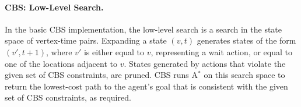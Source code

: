 \documentclass[letterpaper]{article} %
\newcommand\roni[1]{\nb{\textbf{Roni:}}{orange}{#1}}
\newcommand{\cbs}{\ac{CBS}\xspace}
\newcommand{\astar}{A$^*$\xspace}
\begin{document}


\paragraph{\cbs: Low-Level Search.}
In the basic \cbs implementation, the low-level search is a search in the state space of vertex-time pairs.
Expanding a state $(v,t)$ generates states of the form $(v',t+1)$, where $v'$ is either equal to $v$, representing a wait action, or equal to one of the locations adjacent to $v$.
States generated by actions that violate the given set of \cbs constraints, are pruned.
\cbs runs \astar on this search space to return the lowest-cost path to the agent's goal that is consistent with the given set of \ac{CBS} constraints, as required.

\end{document}
